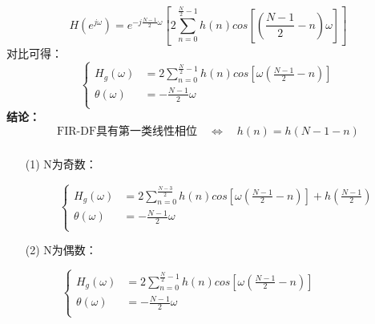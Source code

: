 \documentclass[notheorems,compress,mathserif,table]{beamer}
\begin{document}
\begin{frame}[allowframebreaks]\frametitle{}%
$$H(e^{j\omega})= e^{-j\frac{N-1}{2}\omega}\left[
                    2\sum_{n=0}^{\frac{N}{2}-1}h(n)cos\left[(\frac{N-1}{2}
                    -n)\omega\right]\right]$$
            对比可得：
            $$
            \left\{ \begin{aligned}
            H_g(\omega)
                   &= 2\sum_{n=0}^{\frac{N}{2}-1}h(n)
                      cos\left[\omega(\frac{N-1}{2}-n)\right]\\
            \theta(\omega)
                   &=  -\frac{N-1}{2}\omega\\
            \end{aligned} \right.
            $$
            \textbf{结论：}
            $$\mbox{FIR-DF具有第一类线性相位}\quad \Longleftrightarrow \quad h(n)=h(N-1-n)$$




\end{frame}

\begin{frame}[shrink]\frametitle{}%

\begin{enumerate}
\item [(1)] N为奇数：\par
$$
\left\{ \begin{aligned}
    H_g(\omega)   &= 2\sum_{n=0}^{\frac{N-3}{2}}h(n)
                     cos[\omega(\frac{N-1}{2}-n)]+h(\frac{N-1}{2})\\
    \theta(\omega)&=  -\frac{N-1}{2}\omega\quad
                       \\
\end{aligned} \right.
$$


\item [(2)] N为偶数：\par
$$
\left\{ \begin{aligned}
H_g(\omega)
       &= 2\sum_{n=0}^{\frac{N}{2}-1}h(n)
          cos\left[\omega(\frac{N-1}{2}-n)\right]\quad\quad\quad\quad\quad\\
\theta(\omega)
       &=  -\frac{N-1}{2}\omega\\
\end{aligned} \right.
$$
\end{enumerate}

\end{frame}
\end{document}
